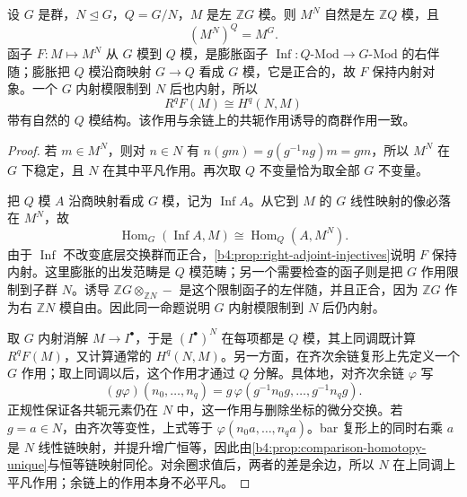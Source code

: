 \begin{proposition}\label{b4:prop:normal-subgroup-invariants}
	设 \(G\) 是群，\(N\trianglelefteq G\)，\(Q=G/N\)，\(M\) 是左 \(\mathbb ZG\) 模。则 \(M^N\) 自然是左 \(\mathbb ZQ\) 模，且
	\[
		(M^N)^Q=M^G.
	\]
	函子 \(F:M\mapsto M^N\) 从 \(G\) 模到 \(Q\) 模，是膨胀函子 \(\operatorname{Inf}:Q\text{-Mod}\to G\text{-Mod}\) 的右伴随；膨胀把 \(Q\) 模沿商映射 \(G\to Q\) 看成 \(G\) 模，它是正合的，故 \(F\) 保持内射对象。一个 \(G\) 内射模限制到 \(N\) 后也内射，所以
	\[
		R^qF(M)\cong H^q(N,M)
	\]
	带有自然的 \(Q\) 模结构。该作用与余链上的共轭作用诱导的商群作用一致。
\end{proposition}
\begin{proof}
	若 \(m\in M^N\)，则对 \(n\in N\) 有 \(n(gm)=g(g^{-1}ng)m=gm\)，所以 \(M^N\) 在 \(G\) 下稳定，且 \(N\) 在其中平凡作用。再次取 \(Q\) 不变量恰为取全部 \(G\) 不变量。

	把 \(Q\) 模 \(A\) 沿商映射看成 \(G\) 模，记为 \(\operatorname{Inf}A\)。从它到 \(M\) 的 \(G\) 线性映射的像必落在 \(M^N\)，故
	\[
		\operatorname{Hom}_G(\operatorname{Inf}A,M) \cong\operatorname{Hom}_Q(A,M^N).
	\]
	由于 \(\operatorname{Inf}\) 不改变底层交换群而正合，\cref{b4:prop:right-adjoint-injectives}说明 \(F\) 保持内射。这里膨胀的出发范畴是 \(Q\) 模范畴；另一个需要检查的函子则是把 \(G\) 作用限制到子群 \(N\)。诱导 \(\mathbb ZG\otimes_{\mathbb ZN}-\) 是这个限制函子的左伴随，并且正合，因为 \(\mathbb ZG\) 作为右 \(\mathbb ZN\) 模自由。因此同一命题说明 \(G\) 内射模限制到 \(N\) 后仍内射。

	取 \(G\) 内射消解 \(M\to I^\bullet\)，于是 \((I^\bullet)^N\) 在每项都是 \(Q\) 模，其上同调既计算 \(R^qF(M)\)，又计算通常的 \(H^q(N,M)\)。另一方面，在齐次余链复形上先定义一个 \(G\) 作用；取上同调以后，这个作用才通过 \(Q\) 分解。具体地，对齐次余链 \(\varphi\) 写
	\[
		(g\varphi)(n_0,\ldots,n_q) =g\,\varphi(g^{-1}n_0g,\ldots,g^{-1}n_qg).
	\]
	正规性保证各共轭元素仍在 \(N\) 中，这一作用与删除坐标的微分交换。若 \(g=a\in N\)，由齐次等变性，上式等于 \(\varphi(n_0a,\ldots,n_qa)\)。bar 复形上的同时右乘 \(a\) 是 \(N\) 线性链映射，并提升增广恒等，因此由\cref{b4:prop:comparison-homotopy-unique}与恒等链映射同伦。对余圈求值后，两者的差是余边，所以 \(N\) 在上同调上平凡作用；余链上的作用本身不必平凡。


\end{proof}

